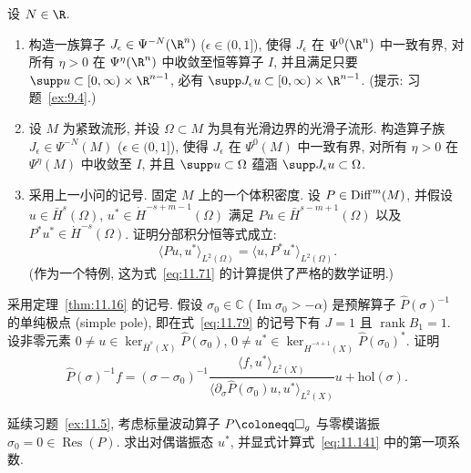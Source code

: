 \begin{exer}[正则化论证]\label{ex:11.4}
设 $N \in \R$.
\begin{enumerate}[label=(\arabic*)]
    \item 构造一族算子 $J_\epsilon \in \Psi^{-N}(\R^n)$ ($\epsilon \in (0, 1]$), 使得 $J_\epsilon$ 在 $\Psi^0(\R^n)$ 中一致有界, 对所有 $\eta > 0$ 在 $\Psi^\eta(\R^n)$ 中收敛至恒等算子 $I$, 并且满足只要 $\supp u \subset [0, \infty) \times \R^{n-1}$, 必有 $\supp J_\epsilon u \subset [0, \infty) \times \R^{n-1}$. (提示: 习题~\ref{ex:9.4}.)
    \item 设 $M$ 为紧致流形, 并设 $\Omega \subset M$ 为具有光滑边界的光滑子流形. 构造算子族 $J_\epsilon \in \Psi^{-N}(M)$ ($\epsilon \in (0, 1]$), 使得 $J_\epsilon$ 在 $\Psi^0(M)$ 中一致有界, 对所有 $\eta > 0$ 在 $\Psi^\eta(M)$ 中收敛至 $I$, 并且 $\supp u \subset \Omega$ 蕴涵 $\supp J_\epsilon u \subset \Omega$.
    \item 采用上一小问的记号. 固定 $M$ 上的一个体积密度. 设 $P \in \operatorname{Diff}^m(M)$, 并假设 $u \in \bar H^s(\Omega)$, $u^* \in \dot H^{-s+m-1}(\Omega)$ 满足 $P u \in \bar H^{s-m+1}(\Omega)$ 以及 $P^* u^* \in \dot H^{-s}(\Omega)$. 证明分部积分恒等式成立:
    \begin{equation}\label{eq:11.140}
        \langle P u, u^* \rangle_{L^2(\Omega)} = \langle u, P^* u^* \rangle_{L^2(\Omega)}.
    \end{equation}
    (作为一个特例, 这为式~\eqref{eq:11.71} 的计算提供了严格的数学证明.)
\end{enumerate}
\end{exer}

\begin{exer}\label{ex:11.5}
采用定理~\ref{thm:11.16} 的记号. 假设 $\sigma_0 \in \mathbb{C}$ ($\operatorname{Im}\sigma_0 > -\alpha$) 是预解算子 $\widehat{P}(\sigma)^{-1}$ 的单纯极点 (simple pole), 即在式~\eqref{eq:11.79} 的记号下有 $J = 1$ 且 $\operatorname{rank} B_1 = 1$. 设非零元素 $0 \neq u \in \ker_{\bar H^s(X)} \widehat{P}(\sigma_0)$, $0 \neq u^* \in \ker_{\dot H^{-s+1}(X)} \widehat{P}(\sigma_0)^*$. 证明
\begin{equation}\label{eq:11.141}
    \widehat{P}(\sigma)^{-1} f = (\sigma - \sigma_0)^{-1} \frac{\langle f, u^* \rangle_{L^2(X)}}{\langle \partial_\sigma \widehat{P}(\sigma_0) u, u^* \rangle_{L^2(X)}} u + \mathrm{hol}(\sigma).
\end{equation}
\end{exer}

\begin{exer}\label{ex:11.6}
延续习题~\ref{ex:11.5}, 考虑标量波动算子 $P \defeq \Box_g$ 与零模谐振 $\sigma_0 = 0 \in \operatorname{Res}(P)$. 求出对偶谐振态 $u^*$, 并显式计算式~\eqref{eq:11.141} 中的第一项系数.
\end{exer}

